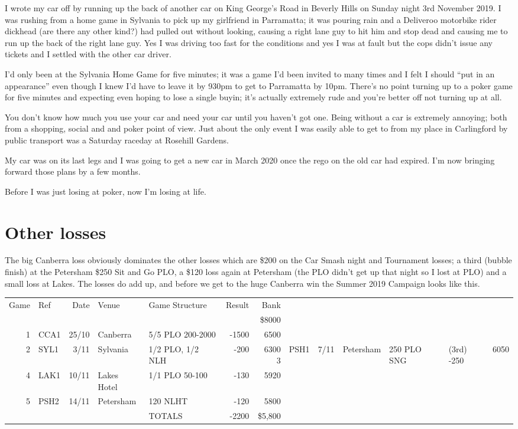 I wrote my car off by running up the back of another car on King
George's Road in Beverly Hills on Sunday night 3rd November 2019.
I was rushing from a home game in Sylvania to pick up my girlfriend in
Parramatta; it was pouring rain and a Deliveroo motorbike
rider dickhead (are there any other kind?) had pulled out without
looking, causing a right lane guy to hit him and stop dead and causing
me to run up the back of the right lane guy. Yes I was driving too
fast for the conditions and yes I was at fault but the cops didn't
issue any tickets and I settled with the other car driver.

I'd only been at the Sylvania Home Game for five minutes; it was a
game I'd been invited to many times and I felt I should ``put in an
appearance'' even though I knew I'd have to leave it by 930pm to get
to Parramatta by 10pm. There's no point turning up to a poker game for
five minutes and expecting even hoping to lose a single buyin; it's
actually extremely rude and you're better off not turning up at all.

You don't know how much you use your car and need your car until you
haven't got one. Being without a car is extremely annoying; both from
a shopping, social and and poker point of view. Just about the only
event I was easily able to get to from my place in Carlingford by
public transport was a Saturday raceday at Rosehill Gardens.

My car was on its last legs and I was going to get a new car in March
2020 once the rego on the old car had expired. I'm now bringing
forward those plans by a few months.

Before I was just losing at poker, now I'm losing at life.

\section*{Other losses}

The big Canberra loss obviously dominates the other losses which are
\$200 on the Car Smash night and Tournament losses; a third (bubble
finish) at the Petersham \$250 Sit and Go PLO, a \$120 loss again at
Petersham (the PLO didn't get up that night so I lost at PLO) and a
small loss at Lakes. The losses do add up, and before we get to
the huge Canberra win the Summer 2019 Campaign looks like this.

\begin{tabular}{rlrllrr}
 Game & Ref & Date & Venue & Game Structure & Result & Bank \\
     &           &      &           &             &       & \$8000 \\
  1  &   CCA1    & 25/10 & Canberra & 5/5 PLO 200-2000 & -1500 & 6500 \\
  2  &   SYL1    &  3/11 & Sylvania & 1/2 PLO, 1/2 NLH &  -200 & 6300
  3  &   PSH1    &  7/11 & Petersham & 250 PLO SNG & (3rd) -250 & 6050 \\
  4  &   LAK1    & 10/11 & Lakes Hotel & 1/1 PLO 50-100 &  -130 & 5920 \\
  5  &   PSH2    & 14/11 & Petersham & 120 NLHT & -120 & 5800 \\
     &           &       &           & TOTALS & -2200 & \$5,800 \\
\end{tabular}
